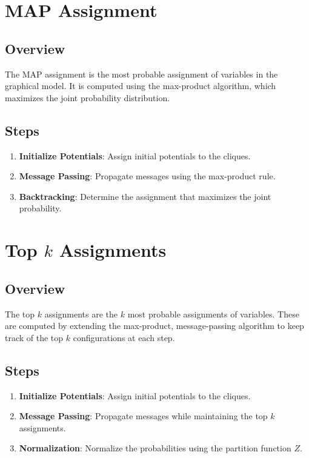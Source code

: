 \documentclass{article}
\begin{document}
\section{MAP Assignment}
\subsection{Overview}
The MAP assignment is the most probable assignment of variables in the graphical model. It is computed using the max-product algorithm, which maximizes the joint probability distribution.

\subsection{Steps}
\begin{enumerate}
    \item \textbf{Initialize Potentials}: Assign initial potentials to the cliques.
    \item \textbf{Message Passing}: Propagate messages using the max-product rule.
    \item \textbf{Backtracking}: Determine the assignment that maximizes the joint probability.
\end{enumerate}

\section{Top \( k \) Assignments}
\subsection{Overview}
The top \( k \) assignments are the \( k \) most probable assignments of variables. These are computed by extending the max-product, message-passing algorithm to keep track of the top \( k \) configurations at each step.

\subsection{Steps}
\begin{enumerate}
    \item \textbf{Initialize Potentials}: Assign initial potentials to the cliques.
    \item \textbf{Message Passing}: Propagate messages while maintaining the top \( k \) assignments.
    \item \textbf{Normalization}: Normalize the probabilities using the partition function \( Z \).
\end{enumerate}
\end{document}

